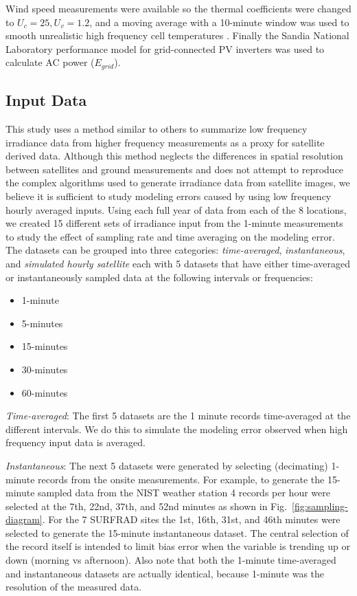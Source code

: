 \documentclass[conference]{IEEEtran}
\begin{document}
Wind speed measurements were available so the thermal coefficients were changed to $U_c=25, U_v=1.2$, and a moving average with a 10-minute window was used to smooth unrealistic high frequency cell temperatures \cite{9095219}. Finally the Sandia National Laboratory performance model for grid-connected PV inverters \cite{King2007} was used to calculate AC power ($E_{grid}$).

\subsection{Input Data}
This study uses a method similar to others to summarize low frequency irradiance data from higher frequency measurements \cite{Bowersox2021,osti_1797569} as a proxy for satellite derived data. Although this method neglects the differences in spatial resolution between satellites and ground measurements and does not attempt to reproduce the complex algorithms used to generate irradiance data from satellite images, we believe it is sufficient to study modeling errors caused by using low frequency hourly averaged inputs. Using each full year of data from each of the 8 locations, we created 15 different sets of irradiance input from the 1-minute measurements to study the effect of sampling rate and time averaging on the modeling error. The datasets can be grouped into three categories: \emph{time-averaged}, \emph{instantaneous}, and \emph{simulated hourly satellite} each with 5 datasets that have either time-averaged or instantaneously sampled data at the following intervals or frequencies:

\begin{itemize}
    \item 1-minute
    \item 5-minutes
    \item 15-minutes
    \item 30-minutes
    \item 60-minutes
\end{itemize}

\emph{Time-averaged}: The first 5 datasets are the 1 minute records time-averaged at the different intervals. We do this to simulate the modeling error observed when high frequency input data is averaged.

\emph{Instantaneous}: The next 5 datasets were generated by selecting (decimating) 1-minute records from the onsite measurements. For example, to generate the 15-minute sampled data from the NIST weather station 4 records per hour were selected at the 7th, 22nd, 37th, and 52nd minutes as shown in Fig.~\ref{fig:sampling-diagram}. For the 7 SURFRAD sites the 1st, 16th, 31st, and 46th minutes were selected to generate the 15-minute instantaneous dataset. The central selection of the record itself is intended to limit bias error when the variable is trending up or down (morning vs afternoon). Also note that both the 1-minute time-averaged and instantaneous datasets are actually identical, because 1-minute was the resolution of the measured data.
\end{document}
